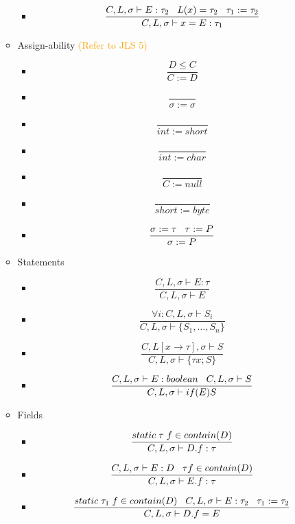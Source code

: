 \documentclass{article}
\begin{document}
\begin{itemize}
\begin{itemize}
\begin{itemize}
\item $$ \frac{C, L, \sigma \vdash  E : \tau_2 \hspace{0.3cm} L(x) = \tau_2 \hspace{0.3cm} \tau_1 := \tau_2}{C, L, \sigma \vdash x = E : \tau_1} $$
\end{itemize}
\item Assign-ability \textcolor{orange}{(Refer to JLS 5)}
\begin{itemize}
\item $$\frac{D \leq C}{C := D }$$
\item $$ \frac{}{\sigma := \sigma}$$
\item $$\frac{}{int := short}$$
\item $$\frac{}{int := char}$$
\item $$\frac{}{C := null}$$
\item $$\frac{}{short := byte}$$
\item $$\frac{\sigma: = \tau \hspace{0.3cm} \tau := P}{\sigma := P}$$
\end{itemize}
\item Statements
\begin{itemize}
\item $$ \frac{C, L, \sigma \vdash E : \tau}{C, L, \sigma \vdash E}$$
\item $$ \frac{\forall i: C, L, \sigma \vdash S_i}{C, L, \sigma \vdash \{S_1, \ldots, S_n\}}$$
\item $$ \frac{C, L[x \rightarrow \tau], \sigma \vdash S}{C, L, \sigma \vdash \{\tau x; S\}}$$
\item $$ \frac{C, L, \sigma \vdash E : boolean \hspace{0.3cm} C, L, \sigma \vdash S}{C, L, \sigma \vdash if(E) S}$$
\end{itemize}
\item Fields
\begin{itemize}
\item $$ \frac{static \hspace{0.1cm} \tau \hspace{0.1cm} f \in contain (D)}{C, L, \sigma \vdash D.f : \tau}$$
\item $$ \frac{C, L, \sigma \vdash E : D \hspace{0.3cm} \tau f \in contain(D)}{C, L, \sigma \vdash E.f : \tau}$$
\item $$\frac{static \hspace{0.1cm} \tau_1 \hspace{0.1cm} f \in contain(D) \hspace{0.3cm} C, L, \sigma \vdash E: \tau_2 \hspace{0.3cm} \tau_1 := \tau_2 }{C, L, \sigma \vdash D.f = E}$$

\end{itemize}
\end{itemize}
\end{itemize}
\end{document}
